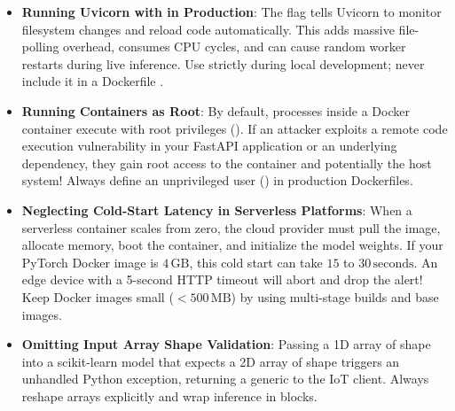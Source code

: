 \begin{warning}
\begin{itemize}
    \item \textbf{Running Uvicorn with  in Production}:
    The  flag tells Uvicorn to monitor filesystem changes and reload code automatically. This adds massive file-polling overhead, consumes CPU cycles, and can cause random worker restarts during live inference. Use  strictly during local development; never include it in a Dockerfile .
    \item \textbf{Running Containers as Root}:
    By default, processes inside a Docker container execute with root privileges (). If an attacker exploits a remote code execution vulnerability in your FastAPI application or an underlying dependency, they gain root access to the container and potentially the host system! Always define an unprivileged user () in production Dockerfiles.
    \item \textbf{Neglecting Cold-Start Latency in Serverless Platforms}:
    When a serverless container scales from zero, the cloud provider must pull the image, allocate memory, boot the container, and initialize the model weights. If your PyTorch Docker image is $4\,\text{GB}$, this cold start can take $15$ to $30\,\text{seconds}$. An edge device with a 5-second HTTP timeout will abort and drop the alert! Keep Docker images small ($< 500\,\text{MB}$) by using multi-stage builds and  base images.
    \item \textbf{Omitting Input Array Shape Validation}:
    Passing a 1D array of shape  into a scikit-learn model that expects a 2D array of shape  triggers an unhandled Python exception, returning a generic  to the IoT client. Always reshape arrays explicitly and wrap inference in  blocks.
\end{itemize}
\end{warning}

